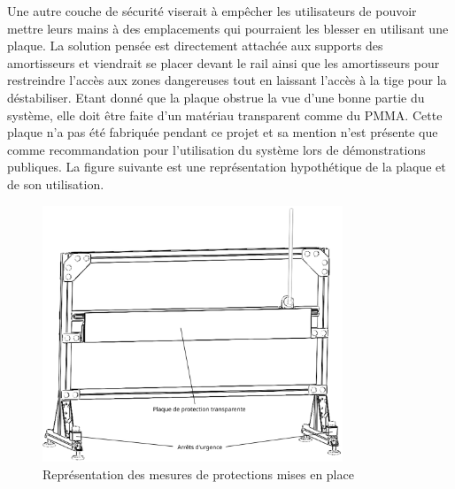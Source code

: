 Une autre couche de sécurité viserait à empêcher les utilisateurs de pouvoir mettre leurs mains à des emplacements qui pourraient les blesser en
utilisant une plaque. La solution pensée est directement attachée aux supports des amortisseurs et viendrait se placer devant le rail ainsi que
les amortisseurs pour restreindre l'accès aux zones dangereuses tout en laissant l'accès à la tige pour la déstabiliser. Etant donné que la plaque
obstrue la vue d'une bonne partie du système, elle doit être faite d'un matériau transparent comme du \acrshort{PMMA}. Cette plaque n'a pas été
fabriquée pendant ce projet et sa mention n'est présente que comme recommandation pour l'utilisation du système lors de démonstrations publiques.
La figure suivante est une représentation hypothétique de la plaque et de son utilisation.

\begin{figure}[H]
    \centering
    \includegraphics[width = 0.8\textwidth]{assets/figures/Securite.svg}
    \caption{Représentation des mesures de protections mises en place}
    \label{fig:Securite}
\end{figure}